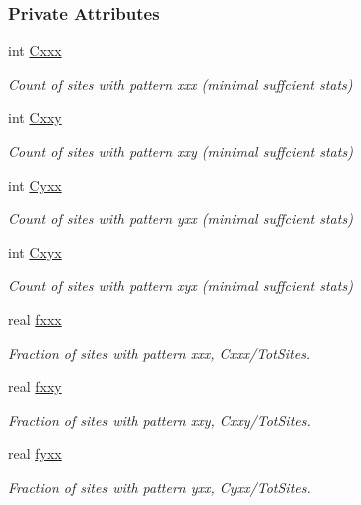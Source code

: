 \subsubsection*{\-Private \-Attributes}
\begin{DoxyCompactItemize}
\item 
int \hyperlink{classFCFN3UnRooted_a52b3db1c0464e43eb76fd9c2f85f3adb}{\-Cxxx}
\begin{DoxyCompactList}\small\item\em \-Count of sites with pattern xxx (minimal suffcient stats) \end{DoxyCompactList}\item 
int \hyperlink{classFCFN3UnRooted_a9ef322fbaba733780643eb3f748c61e8}{\-Cxxy}
\begin{DoxyCompactList}\small\item\em \-Count of sites with pattern xxy (minimal suffcient stats) \end{DoxyCompactList}\item 
int \hyperlink{classFCFN3UnRooted_a8a1912c84680898ee998bfcc8e59cab2}{\-Cyxx}
\begin{DoxyCompactList}\small\item\em \-Count of sites with pattern yxx (minimal suffcient stats) \end{DoxyCompactList}\item 
int \hyperlink{classFCFN3UnRooted_aee129a305aebfe530f9025bdc5a64c22}{\-Cxyx}
\begin{DoxyCompactList}\small\item\em \-Count of sites with pattern xyx (minimal suffcient stats) \end{DoxyCompactList}\item 
real \hyperlink{classFCFN3UnRooted_aa1b615a046f2277b3df566a3bc7bd1f0}{fxxx}
\begin{DoxyCompactList}\small\item\em \-Fraction of sites with pattern xxx, \-Cxxx/\-Tot\-Sites. \end{DoxyCompactList}\item 
real \hyperlink{classFCFN3UnRooted_ad171363b9f0e86aab5c0116fb4b6c838}{fxxy}
\begin{DoxyCompactList}\small\item\em \-Fraction of sites with pattern xxy, \-Cxxy/\-Tot\-Sites. \end{DoxyCompactList}\item 
real \hyperlink{classFCFN3UnRooted_a283443b3c043b8859da0a3c2e24c5263}{fyxx}
\begin{DoxyCompactList}\small\item\em \-Fraction of sites with pattern yxx, \-Cyxx/\-Tot\-Sites. \end{DoxyCompactList}\item 

\end{DoxyCompactItemize}
